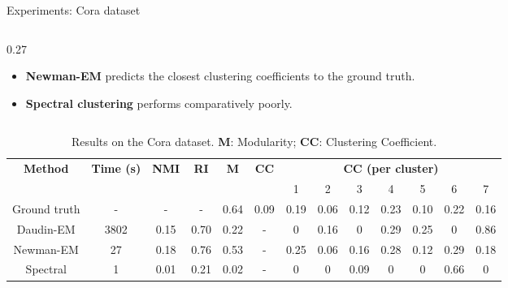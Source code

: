 \documentclass[final]{beamer}
\newlength{\colwidth}
\begin{document}
\begin{frame}[t]
\begin{columns}[t]
\begin{column}{\colwidth}
\begin{block}{Experiments: Cora dataset}
\begin{column}{0.27\colwidth}
\begin{itemize}
            \item \textbf{Newman-EM} predicts the closest clustering coefficients to the ground truth.
            \item \textbf{Spectral clustering} performs comparatively poorly.
          \end{itemize}
        \end{column}
        \begin{table}[H]
          \centering
          \small
          \setlength\heavyrulewidth{0.25ex}
          \begin{tabular}{@{}ccccccccccccc@{}}
            \toprule
            \multirow{2}{*}{\textbf{Method}}  & \multirow{2}{*}{\textbf{Time (s)}} & \multirow{2}{*}{\textbf{NMI}} & \multirow{2}{*}{\textbf{RI}} & \multirow{2}{*}{\textbf{M}} & \multirow{2}{*}{\textbf{CC}} & \multicolumn{7}{c}{\textbf{CC (per cluster)}}                                           \\
                                              &                                    &                               &                              &                             &                              & 1                                             & 2    & 3    & 4    & 5    & 6    & 7    \\ \midrule \midrule
            \multicolumn{1}{c|}{Ground truth} & \multicolumn{1}{c|}{-}             & -                             & \multicolumn{1}{c|}{-}       & 0.64                        & 0.09                         & 0.19                                          & 0.06 & 0.12 & 0.23 & 0.10 & 0.22 & 0.16 \\
            \multicolumn{1}{c|}{Daudin-EM}    & \multicolumn{1}{c|}{3802}          & 0.15                          & \multicolumn{1}{c|}{0.70}    & 0.22                        & -                            & 0                                             & 0.16 & 0    & 0.29 & 0.25 & 0    & 0.86 \\
            \multicolumn{1}{c|}{Newman-EM}    & \multicolumn{1}{c|}{27}            & 0.18                          & \multicolumn{1}{c|}{0.76}    & 0.53                        & -                            & 0.25                                          & 0.06 & 0.16 & 0.28 & 0.12 & 0.29 & 0.18 \\
            \multicolumn{1}{c|}{Spectral}     & \multicolumn{1}{c|}{1}             & 0.01                          & \multicolumn{1}{c|}{0.21}    & 0.02                        & -                            & 0                                             & 0    & 0.09 & 0    & 0    & 0.66 & 0    \\ \bottomrule
          \end{tabular}
          \caption{Results on the Cora dataset. \textbf{M}: Modularity; \textbf{CC}: Clustering Coefficient.}
        \end{table}


\end{block}
\end{column}
\end{columns}
\end{frame}
\end{document}
